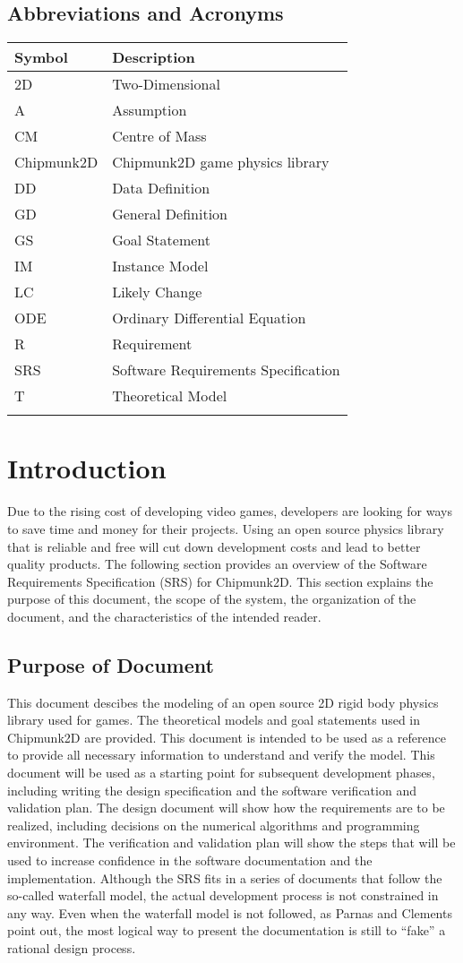 \documentclass[12pt]{article}
\begin{document}
\subsection{Abbreviations and Acronyms}
\label{Sec:TAbbAcc}
\begin{longtable*}{l l}
\toprule
Symbol & Description
\\
\midrule
2D & Two-Dimensional
\\
A & Assumption
\\
CM & Centre of Mass
\\
Chipmunk2D & Chipmunk2D game physics library
\\
DD & Data Definition
\\
GD & General Definition
\\
GS & Goal Statement
\\
IM & Instance Model
\\
LC & Likely Change
\\
ODE & Ordinary Differential Equation
\\
R & Requirement
\\
SRS & Software Requirements Specification
\\
T & Theoretical Model
\\
\bottomrule
\label{Table:TAbbAcc}
\end{longtable*}
\section{Introduction}
\label{Sec:Intro}
Due to the rising cost of developing video games, developers are looking for ways to save time and money for their projects. Using an open source physics library that is reliable and free will cut down development costs and lead to better quality products.
The following section provides an overview of the Software Requirements Specification (SRS) for Chipmunk2D. This section explains the purpose of this document, the scope of the system, the organization of the document, and the characteristics of the intended reader.
\subsection{Purpose of Document}
\label{Sec:DocPurpose}
This document descibes the modeling of an open source 2D rigid body physics library used for games. The theoretical models and goal statements used in Chipmunk2D are provided. This document is intended to be used as a reference to provide all necessary information to understand and verify the model.
This document will be used as a starting point for subsequent development phases, including writing the design specification and the software verification and validation plan. The design document will show how the requirements are to be realized, including decisions on the numerical algorithms and programming environment. The verification and validation plan will show the steps that will be used to increase confidence in the software documentation and the implementation. Although the SRS fits in a series of documents that follow the so-called waterfall model, the actual development process is not constrained in any way. Even when the waterfall model is not followed, as Parnas and Clements point out, the most logical way to present the documentation is still to ``fake'' a rational design process.
\end{document}
